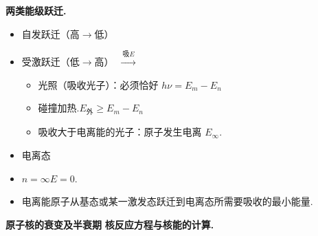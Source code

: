 \textbf{两类能级跃迁.} %
\begin{itemize}
\item 自发跃迁（高$\to$低）
\item 受激跃迁（低$\to$高）\ $\xrightarrow{\ \text{吸}E\ }$
  \begin{itemize}
  \item 光照（吸收光子）：必须恰好 $h\nu=E_m-E_n$
  \item 碰撞加热.\quad $E_{\text{外}}\ge E_m-E_n$
  \item 吸收大于电离能的光子：原子发生电离 $E_\infty$.
  \end{itemize}
\end{itemize}

\begin{itemize}
\item 电离态
\item $n=\infty$\quad $E=0$. %
\item 电离能\quad 原子从基态或某一激发态跃迁到电离态所需要吸收的最小能量.
\end{itemize}
\textbf{原子核的衰变及半衰期}
\textbf{核反应方程与核能的计算.}
